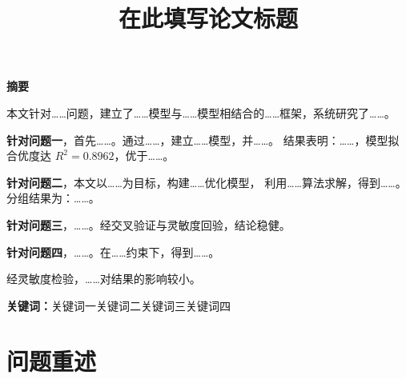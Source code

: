 \documentclass[UTF8,12pt,a4paper,fontset=windows]{ctexart}
\title{\bfseries 在此填写论文标题}
\date{}
\author{}
\numberwithin{equation}{section}
\begin{document}
\maketitle
\thispagestyle{fancy}
\vspace{-3em}

\begin{center}\bfseries 摘\quad 要\end{center}

本文针对……问题，建立了……模型与……模型相结合的……框架，系统研究了……。

\textbf{针对问题一}，首先……。通过……，建立……模型，并……。
结果表明：……，模型拟合优度达 $R^2=0.8962$，优于……。

\textbf{针对问题二}，本文以……为目标，构建……优化模型，
利用……算法求解，得到……。分组结果为：……。

\textbf{针对问题三}，……。经交叉验证与灵敏度回验，结论稳健。

\textbf{针对问题四}，……。在……约束下，得到……。

经灵敏度检验，……对结果的影响较小。

\vspace{1em}
\noindent\textbf{关键词：}\quad 关键词一\quad 关键词二\quad 关键词三\quad 关键词四

\newpage

\section{问题重述}
\end{document}
